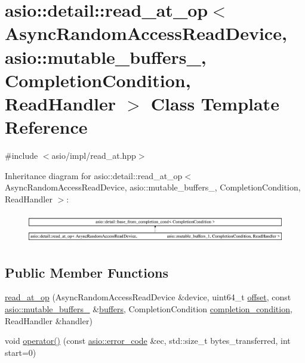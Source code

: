 \hypertarget{classasio_1_1detail_1_1read__at__op_3_01_async_random_access_read_device_00_01_01_01_01_01_01_01ccd5681b695707fee491134502088d0f}{}\section{asio\+:\+:detail\+:\+:read\+\_\+at\+\_\+op$<$ Async\+Random\+Access\+Read\+Device, asio\+:\+:mutable\+\_\+buffers\+\_, Completion\+Condition, Read\+Handler $>$ Class Template Reference}
\label{classasio_1_1detail_1_1read__at__op_3_01_async_random_access_read_device_00_01_01_01_01_01_01_01ccd5681b695707fee491134502088d0f}


{\ttfamily \#include $<$asio/impl/read\+\_\+at.\+hpp$>$}

Inheritance diagram for asio\+:\+:detail\+:\+:read\+\_\+at\+\_\+op$<$ Async\+Random\+Access\+Read\+Device, asio\+:\+:mutable\+\_\+buffers\+\_, Completion\+Condition, Read\+Handler $>$\+:\begin{figure}[H]
\begin{center}
\leavevmode
\includegraphics[height=1.327014cm]{classasio_1_1detail_1_1read__at__op_3_01_async_random_access_read_device_00_01_01_01_01_01_01_01ccd5681b695707fee491134502088d0f}
\end{center}
\end{figure}
\subsection*{Public Member Functions}
\begin{DoxyCompactItemize}
\item 
\hyperlink{classasio_1_1detail_1_1read__at__op_3_01_async_random_access_read_device_00_01_01_01_01_01_01_01ccd5681b695707fee491134502088d0f_a521e1379600afb8133138fe33d606f90}{read\+\_\+at\+\_\+op} (Async\+Random\+Access\+Read\+Device \&device, uint64\+\_\+t \hyperlink{group__async__read__at_ga8dcdb41a4adfd6fe5322b5dd666d9f29}{offset}, const \hyperlink{classasio_1_1mutable__buffers__1}{asio\+::mutable\+\_\+buffers\+\_} \&\hyperlink{group__async__read_ga54dede45c3175148a77fe6635222c47d}{buffers}, Completion\+Condition \hyperlink{group__async__read_gae2e215d5013596cc2b385bb6c13fa518}{completion\+\_\+condition}, Read\+Handler \&handler)
\item 
void \hyperlink{classasio_1_1detail_1_1read__at__op_3_01_async_random_access_read_device_00_01_01_01_01_01_01_01ccd5681b695707fee491134502088d0f_abdf76ca48136b3122f4dbb5ac1c3383c}{operator()} (const \hyperlink{classasio_1_1error__code}{asio\+::error\+\_\+code} \&ec, std\+::size\+\_\+t bytes\+\_\+transferred, int start=0)
\end{DoxyCompactItemize}
